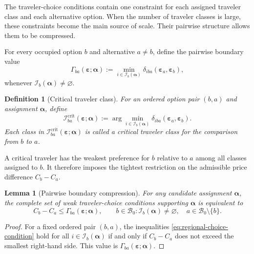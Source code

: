 \documentclass{article}
\newtheorem{lemma}{Lemma}
\newtheorem{definition}{Definition}
\begin{document}
The traveler-choice conditions contain one constraint for each assigned
traveler class and each alternative option. When the number of traveler
classes is large, these constraints become the main source of scale.
Their pairwise structure allows them to be compressed.

For every occupied option $b$ and alternative $a\neq b$, define the
pairwise boundary value
\begin{equation}
    \Gamma_{ba}(\bm\varepsilon;\bm\alpha)
    :=
    \min_{i\in\mathcal I_b(\bm\alpha)}
    \delta_{iba}(\bm\varepsilon_a,\bm\varepsilon_b),
    \label{eq:pairwise-boundary-value}
\end{equation}
whenever $\mathcal I_b(\bm\alpha)\neq\varnothing$.

\begin{definition}[Critical traveler class]
For an ordered option pair $(b,a)$ and assignment $\bm\alpha$, define
\begin{equation}
    \mathcal I^{\mathrm{crit}}_{ba}
    (\bm\varepsilon;\bm\alpha)
    :=
    \arg\min_{i\in\mathcal I_b(\bm\alpha)}
    \delta_{iba}(\bm\varepsilon_a,\bm\varepsilon_b).
    \label{eq:critical-traveler-set}
\end{equation}
Each class in
$\mathcal I^{\mathrm{crit}}_{ba}(\bm\varepsilon;\bm\alpha)$
is called a critical traveler class for the comparison from $b$ to
$a$.
\end{definition}

A critical traveler has the weakest preference for $b$ relative to $a$
among all classes assigned to $b$. It therefore imposes the tightest
restriction on the admissible price difference $C_b-C_a$.

\begin{lemma}[Pairwise boundary compression]
For any candidate assignment $\bm\alpha$, the complete set of weak
traveler-choice conditions supporting $\bm\alpha$ is equivalent to
\begin{equation}
    C_b-C_a
    \leq
    \Gamma_{ba}(\bm\varepsilon;\bm\alpha),
    \qquad
    b\in\mathcal B_0:
    \mathcal I_b(\bm\alpha)\neq\varnothing,
    \quad
    a\in\mathcal B_0\setminus\{b\}.
    \label{eq:compressed-assignment-condition}
\end{equation}
\label{lem:pairwise-boundary-compression}
\end{lemma}

\begin{proof}
For a fixed ordered pair $(b,a)$, the inequalities
\eqref{eq:regional-choice-condition} hold for all
$i\in\mathcal I_b(\bm\alpha)$ if and only if $C_b-C_a$ does not exceed
the smallest right-hand side. This value is
$\Gamma_{ba}(\bm\varepsilon;\bm\alpha)$.
\end{proof}
\end{document}
